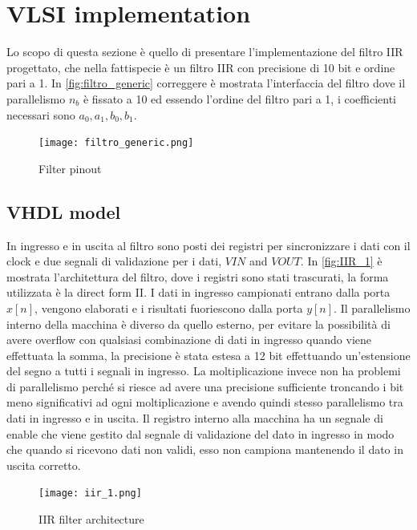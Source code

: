 \section{VLSI implementation}

Lo scopo di questa sezione è quello di presentare l'implementazione del filtro IIR progettato, che nella fattispecie è un filtro IIR con precisione di 10 bit e ordine pari a 1. In \autoref{fig:filtro_generic} {\LARGE correggere} è mostrata l'interfaccia del filtro dove il parallelismo $n_b$ è fissato a 10 ed essendo l'ordine del filtro pari a 1, i coefficienti necessari sono $a_0, a_1, b_0, b_1$.

\begin{figure}[h]
	\center
	\texttt{[image: filtro\_generic.png]}
	\caption{Filter pinout}
	\label{fig:filtro_generic}
\end{figure}


\subsection{VHDL model}
In ingresso e in uscita al filtro sono posti dei registri per sincronizzare i dati con il clock e due segnali di validazione per i dati, $VIN$ and $VOUT$. In \autoref{fig:IIR_1} è mostrata l'architettura del filtro, dove i registri sono stati trascurati, la forma utilizzata è la direct form II. I dati in ingresso campionati entrano dalla porta $x[n]$, vengono elaborati e i risultati fuoriescono dalla porta $y[n]$. Il parallelismo interno della macchina è diverso da quello esterno, per evitare la possibilità di avere overflow con qualsiasi combinazione di dati in ingresso quando viene effettuata la somma, la precisione è stata estesa a 12 bit effettuando un'estensione del segno a tutti i segnali in ingresso. La moltiplicazione invece non ha problemi di parallelismo perché si riesce ad avere una precisione sufficiente troncando i bit meno significativi ad ogni moltiplicazione e avendo quindi stesso parallelismo tra dati in ingresso e in uscita. Il registro interno alla macchina ha un segnale di enable che viene gestito dal segnale di validazione del dato in ingresso in modo che quando si ricevono dati non validi, esso non campiona mantenendo il dato in uscita corretto.

\begin{figure}[h]
	\center
	\texttt{[image: iir\_1.png]}
	\caption{IIR filter architecture}
	\label{fig:IIR_1}
\end{figure}

